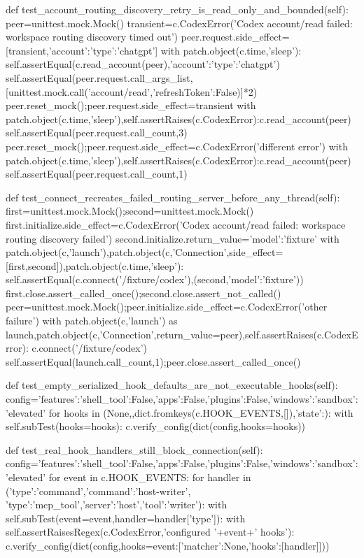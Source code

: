     def test_account_routing_discovery_retry_is_read_only_and_bounded(self):
        peer=unittest.mock.Mock()
        transient=c.CodexError('Codex account/read failed: workspace routing discovery timed out')
        peer.request.side_effect=[transient,{'account':{'type':'chatgpt'}}]
        with patch.object(c.time,'sleep'):
            self.assertEqual(c.read_account(peer),{'account':{'type':'chatgpt'}})
        self.assertEqual(peer.request.call_args_list,[unittest.mock.call('account/read',{'refreshToken':False})]*2)
        peer.reset_mock();peer.request.side_effect=transient
        with patch.object(c.time,'sleep'),self.assertRaises(c.CodexError):c.read_account(peer)
        self.assertEqual(peer.request.call_count,3)
        peer.reset_mock();peer.request.side_effect=c.CodexError('different error')
        with patch.object(c.time,'sleep'),self.assertRaises(c.CodexError):c.read_account(peer)
        self.assertEqual(peer.request.call_count,1)

    def test_connect_recreates_failed_routing_server_before_any_thread(self):
        first=unittest.mock.Mock();second=unittest.mock.Mock()
        first.initialize.side_effect=c.CodexError('Codex account/read failed: workspace routing discovery failed')
        second.initialize.return_value={'model':'fixture'}
        with patch.object(c,'launch'),patch.object(c,'Connection',side_effect=[first,second]),patch.object(c.time,'sleep'):
            self.assertEqual(c.connect('/fixture/codex'),(second,{'model':'fixture'}))
        first.close.assert_called_once();second.close.assert_not_called()
        peer=unittest.mock.Mock();peer.initialize.side_effect=c.CodexError('other failure')
        with patch.object(c,'launch') as launch,patch.object(c,'Connection',return_value=peer),self.assertRaises(c.CodexError):
            c.connect('/fixture/codex')
        self.assertEqual(launch.call_count,1);peer.close.assert_called_once()

    def test_empty_serialized_hook_defaults_are_not_executable_hooks(self):
        config={'features':{'shell_tool':False,'apps':False,'plugins':False},'windows':{'sandbox':'elevated'}}
        for hooks in (None,{},dict.fromkeys(c.HOOK_EVENTS,[]),{'state':{}}):
            with self.subTest(hooks=hooks):
                c.verify_config(dict(config,hooks=hooks))

    def test_real_hook_handlers_still_block_connection(self):
        config={'features':{'shell_tool':False,'apps':False,'plugins':False},'windows':{'sandbox':'elevated'}}
        for event in c.HOOK_EVENTS:
            for handler in ({'type':'command','command':'host-writer'},
                            {'type':'mcp_tool','server':'host','tool':'writer'}):
                with self.subTest(event=event,handler=handler['type']):
                    with self.assertRaisesRegex(c.CodexError,'configured '+event+' hooks'):
                        c.verify_config(dict(config,hooks={event:[{'matcher':None,'hooks':[handler]}]}))

